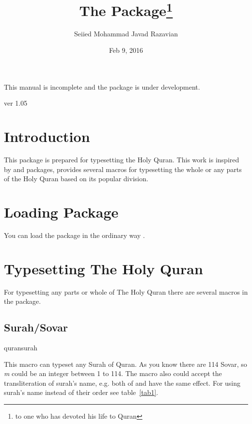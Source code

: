 \documentclass{ltxdoc}
\begin{document}
\title{The  Package\footnote{to one who has devoted his life to Quran}}
\author{Seiied Mohammad Javad Razavian\\}

\date{Feb 9, 2016}
\maketitle

\begin{framed}
This manual is incomplete and the package is under development. \par 
\centerline{ver 1.05}
\end{framed}

\tableofcontents

\section{Introduction}
This package is prepared for typesetting the Holy Quran. This work is inspired by  and 
 packages, provides several macros for
typesetting the whole or any parts of the Holy Quran based on its popular division.

\section{Loading Package}
You can load the package in the ordinary way
.

\section{Typesetting The Holy Quran}
For typesetting any parts or whole of The Holy Quran there are several macros in the package.

\subsection{Surah/Sovar}
\begin{declcs}{quransurah}
\end{declcs}
This macro can typeset any Surah of Quran. As you know there are 114 Sovar, so \textit{m} could 
be an integer between 1 to 114. The macro also could accept the transliteration of surah's name, 
e.g. both of  and  have the same effect. For using 
surah's name instead of their order see table~\ref{tab1}.
\end{document}
